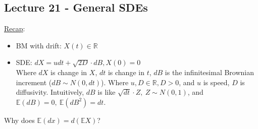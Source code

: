 \documentclass[12pt, letterpaper]{article}
\begin{document}
\subsection{Lecture 21 - General SDEs}
\underline{Recap}:
\begin{itemize}
    \item BM with drift: $X(t) \in \mathbb{R}$
    \item SDE: $dX = udt + \sqrt{2D} \cdot dB, X(0) = 0$ \\
    Where $dX$ is change in $X$, $dt$ is change in $t$, $dB$ is the infinitesimal Brownian 
    increment ($dB \sim N(0,dt)$). Where $u,D \in \mathbb{R}, D > 0$, and $u$ is speed, $D$ 
    is diffusivity. Intuitively, $dB$ is like $\sqrt{dt}\cdot Z,\ Z \sim N(0,1)$, and 
    $\mathbb{E}(dB) = 0,\ \mathbb{E}(dB^2) = dt$.
\end{itemize}
Why does $\mathbb{E}(dx) = d(\mathbb{E}X)$? 
\end{document}
